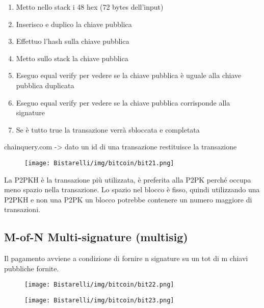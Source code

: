 \begin{enumerate}
    \item Metto nello stack i 48 hex (72 bytes dell’input)
    
    \item Inserisco e duplico la chiave pubblica
    
    \item Effettuo l’hash sulla chiave pubblica
    
    \item Metto sullo stack la chiave pubblica
    
    \item Eseguo equal verify per vedere se la chiave pubblica è uguale alla chiave pubblica duplicata
    
    \item Eseguo equal verify per vedere se la chiave pubblica corrisponde alla signature
    
    \item Se è tutto true la transazione verrà sbloccata e completata
\end{enumerate}

chainquery.com -> dato un id di una transazione restituisce la transazione

\begin{figure}[H]
	\centering
    \texttt{[image: Bistarelli/img/bitcoin/bit21.png]}
\end{figure}

La P2PKH è la transazione più utilizzata, è preferita alla P2PK perché occupa meno spazio nella transazione. Lo
spazio nel blocco è fisso, quindi utilizzando una P2PKH e non una P2PK un blocco potrebbe contenere un numero
maggiore di transazioni.

\subsection{M-of-N Multi-signature (multisig)}
Il pagamento avviene a condizione di fornire n signature su un tot di m chiavi pubbliche fornite.

\begin{figure}[H]
	\centering
    \texttt{[image: Bistarelli/img/bitcoin/bit22.png]}
\end{figure}

\begin{figure}[H]
	\centering
    \texttt{[image: Bistarelli/img/bitcoin/bit23.png]}
\end{figure}

